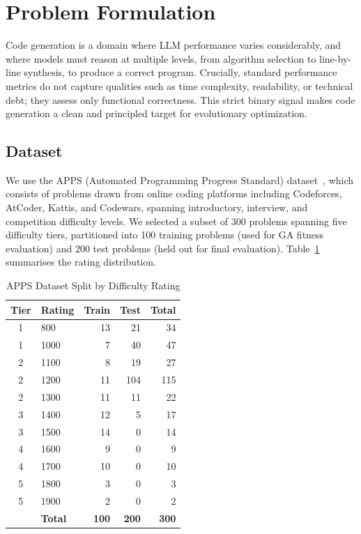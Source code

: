 \documentclass[conference]{IEEEtran}
\begin{document}
\section{Problem Formulation}
\label{sec:problem}

Code generation is a domain where LLM performance varies considerably, and where models
must reason at multiple levels, from algorithm selection to line-by-line synthesis, to
produce a correct program. Crucially, standard performance metrics do not capture qualities
such as time complexity, readability, or technical debt; they assess only functional
correctness. This strict binary signal makes code generation a clean and principled target
for evolutionary optimization.

\subsection{Dataset}

We use the APPS (Automated Programming Progress Standard) dataset~\cite{hendrycks2021apps},
which consists of problems drawn from online coding platforms including Codeforces, AtCoder,
Kattis, and Codewars, spanning introductory, interview, and competition difficulty levels. We selected a subset of 300
problems spanning five difficulty tiers, partitioned into 100 training problems (used for
GA fitness evaluation) and 200 test problems (held out for final evaluation).
Table~\ref{tab:dataset} summarises the rating distribution.

\begin{table}[htbp]
\caption{APPS Dataset Split by Difficulty Rating}
\label{tab:dataset}
\centering
\begin{tabular}{clrr r}
\toprule
\textbf{Tier} & \textbf{Rating} & \textbf{Train} & \textbf{Test} & \textbf{Total} \\
\midrule
1 & 800  &  13 &  21 &  34 \\
1 & 1000 &   7 &  40 &  47 \\
2 & 1100 &   8 &  19 &  27 \\
2 & 1200 &  11 & 104 & 115 \\
2 & 1300 &  11 &  11 &  22 \\
3 & 1400 &  12 &   5 &  17 \\
3 & 1500 &  14 &   0 &  14 \\
4 & 1600 &   9 &   0 &   9 \\
4 & 1700 &  10 &   0 &  10 \\
5 & 1800 &   3 &   0 &   3 \\
5 & 1900 &   2 &   0 &   2 \\
\midrule
  & \textbf{Total} & \textbf{100} & \textbf{200} & \textbf{300} \\
\bottomrule
\end{tabular}
\end{table}
\end{document}
